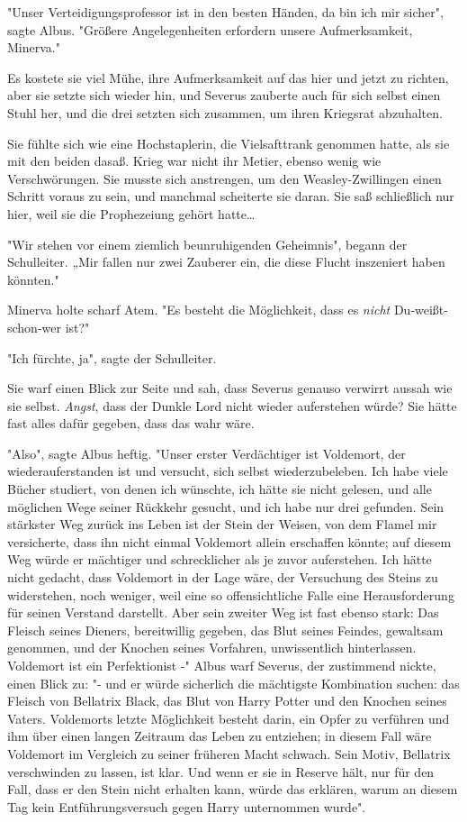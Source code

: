 {"Unser Verteidigungsprofessor ist in den besten Händen, da bin ich mir sicher", sagte Albus. "Größere Angelegenheiten erfordern unsere Aufmerksamkeit, Minerva."

Es kostete sie viel Mühe, ihre Aufmerksamkeit auf das hier und jetzt zu richten, aber sie setzte sich wieder hin, und Severus zauberte auch für sich selbst einen Stuhl her, und die drei setzten sich zusammen, um ihren Kriegsrat abzuhalten.

Sie fühlte sich wie eine Hochstaplerin, die Vielsafttrank genommen hatte, als sie mit den beiden dasaß. Krieg war nicht ihr Metier, ebenso wenig wie Verschwörungen. Sie musste sich anstrengen, um den Weasley-Zwillingen einen Schritt voraus zu sein, und manchmal scheiterte sie daran. Sie saß schließlich nur hier, weil sie die Prophezeiung gehört hatte…

"Wir stehen vor einem ziemlich beunruhigenden Geheimnis", begann der Schulleiter. „Mir fallen nur zwei Zauberer ein, die diese Flucht inszeniert haben könnten."

Minerva holte scharf Atem. "Es besteht die Möglichkeit, dass es \emph{nicht} Du-weißt-schon-wer ist?"

"Ich fürchte, ja", sagte der Schulleiter.

Sie warf einen Blick zur Seite und sah, dass Severus genauso verwirrt aussah wie sie selbst. \emph{Angst}, dass der Dunkle Lord nicht wieder auferstehen würde? Sie hätte fast alles dafür gegeben, dass das wahr wäre.

"Also", sagte Albus heftig. "Unser erster Verdächtiger ist Voldemort, der wiederauferstanden ist und versucht, sich selbst wiederzubeleben. Ich habe viele Bücher studiert, von denen ich wünschte, ich hätte sie nicht gelesen, und alle möglichen Wege seiner Rückkehr gesucht, und ich habe nur drei gefunden. Sein stärkster Weg zurück ins Leben ist der Stein der Weisen, von dem Flamel mir versicherte, dass ihn nicht einmal Voldemort allein erschaffen könnte; auf diesem Weg würde er mächtiger und schrecklicher als je zuvor auferstehen. Ich hätte nicht gedacht, dass Voldemort in der Lage wäre, der Versuchung des Steins zu widerstehen, noch weniger, weil eine so offensichtliche Falle eine Herausforderung für seinen Verstand darstellt. Aber sein zweiter Weg ist fast ebenso stark: Das Fleisch seines Dieners, bereitwillig gegeben, das Blut seines Feindes, gewaltsam genommen, und der Knochen seines Vorfahren, unwissentlich hinterlassen. Voldemort ist ein Perfektionist -" Albus warf Severus, der zustimmend nickte, einen Blick zu: "- und er würde sicherlich die mächtigste Kombination suchen: das Fleisch von Bellatrix Black, das Blut von Harry Potter und den Knochen seines Vaters. Voldemorts letzte Möglichkeit besteht darin, ein Opfer zu verführen und ihm über einen langen Zeitraum das Leben zu entziehen; in diesem Fall wäre Voldemort im Vergleich zu seiner früheren Macht schwach. Sein Motiv, Bellatrix verschwinden zu lassen, ist klar. Und wenn er sie in Reserve hält, nur für den Fall, dass er den Stein nicht erhalten kann, würde das erklären, warum an diesem Tag kein Entführungsversuch gegen Harry unternommen wurde".

}
